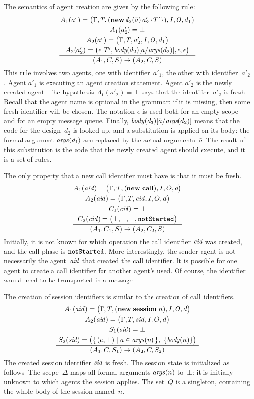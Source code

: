 \documentclass[a4paper,12pt,oneside,fleqn]{book} %
\newcommand{\on}[2]{\genfrac{}{}{0pt}{0}{\strut#1}{\strut#2}}
\begin{document}
The semantics of agent creation are given by the following rule:
\begin{align}
\frac
  {\on{A_1(a'_1)=\bigl(\Gamma,T,({\bf new}\,d_2(\bar{a})\,a'_2\,\{T'\}),I,O,d_1\bigr)}
  {\on{A_1(a'_2)=\bot}
  {\on{A_2(a'_1)=\bigl(\Gamma,T,a'_2,I,O,d_1\bigr)}
  {A_2(a'_2)=\bigl(\epsilon,T',{\it body}(d_2)[\bar{a}/{\it args}(d_2)],\epsilon,\epsilon\bigr)}}}}
  {(A_1,C,S)\to(A_2,C,S)}
\label{eq:opsem-newagent}
\end{align}
This rule involves two agents, one with identifier~$a'_1$, the other with
identifier~$a'_2$. Agent $a'_1$ is executing an agent creation statement.
Agent $a'_2$ is the newly created agent. The hypothesis $A_1(a'_2)=\bot$
says that the identifier~$a'_2$ is fresh. Recall that the agent name is
optional in the grammar: if it is missing, then some fresh identifier will
be chosen.  The notation $\epsilon$ is used both for an empty scope and for
an empty message queue. Finally, ${\it body}(d_2)[\bar{a}/{\it args}(d_2)]$
means that the code for the design~$d_2$ is looked up, and a substitution is
applied on its body: the formal argument ${\it args}(d_2)$ are replaced by
the actual arguments~$\bar a$. The result of this substitution is the code
that the newly created agent should execute, and it is a set of rules.

The only property that a new call identifier must have is that it must be
fresh.
\begin{align}
\frac
  {\on{A_1({\it aid})=\bigl(\Gamma,T,({\bf new}\;{\bf call}),I,O,d\bigr)}
  {\on{A_2({\it aid})=\bigl(\Gamma,T,{\it cid},I,O,d\bigr)}
  {\on{C_1({\it cid})=\bot}
      {C_2({\it cid})=\bigl(\bot,\bot,\bot,{\tt notStarted}\bigr)}}}}
  {(A_1,C_1,S)\to(A_2,C_2,S)}
\end{align}
Initially, it is not known for which operation the call identifier $\it
cid$ was created, and the call phase is $\tt notStarted$. More
interestingly, the sender agent is not necessarily the agent~$\it aid$ that
created the call identifier. It is possible for one agent to create a call
identifier for another agent's used. Of course, the identifier would need
to be transported in a message.

The creation of session identifiers is similar to the creation of
call~identifiers.
\begin{align}
\frac
  {\on{A_1({\it aid})=\bigl(\Gamma,T,({\bf new}\;{\bf session}\;n),I,O,d\bigr)}
  {\on{A_2({\it aid})=\bigl(\Gamma,T,{\it sid},I,O,d\bigr)}
  {\on{S_1({\it sid})=\bot}
      {S_2({\it sid})=\bigl(\{\,(a,\bot)\mid a\in{\it args}(n)\,\},\;
        \{{\it body}(n)\}\bigr)}}}}
  {(A_1,C,S_1)\to(A_2,C,S_2)}
\end{align}
The created session identifier $\it sid$ is fresh. The session state is
initialized as follows. The scope~$\Delta$ maps all formal arguments ${\it
args}(n)$ to~$\bot$: it is initially unknown to which agents the session
applies. The set~$Q$ is a singleton, containing the whole body of the
session named~$n$.
\end{document}
